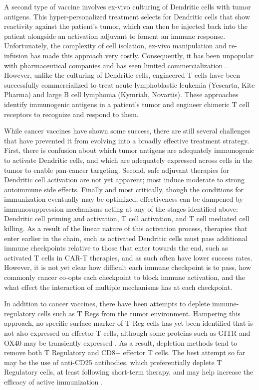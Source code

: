 A second type of vaccine involves ex-vivo culturing of Dendritic cells with tumor antigens. 
This hyper-personalized treatment selects for Dendritic cells that show reactivity against the patient’s tumor, which can then be injected back into the patient alongside an activation adjuvant to foment an immune response. 
Unfortunately, the complexity of cell isolation, ex-vivo manipulation and re-infusion has made this approach very costly. 
Consequently, it has been unpopular with pharmaceutical companies and has seen limited commercialization \citep{Mellman2011}.
However, unlike the culturing of Dendritic cells, engineered T cells have been successfully commercialized to treat acute lymphoblastic leukemia (Yescarta, Kite Pharma) and large B cell lymphoma (Kymriah, Novartis).
These approaches identify immunogenic antigens in a patient’s tumor and engineer chimeric T cell receptors to recognize and respond to them.  

While cancer vaccines have shown some success, there are still several challenges that have prevented it from evolving into a broadly effective treatment strategy. 
First, there is confusion about which tumor antigens are adequately immunogenic to activate Dendritic cells, and which are adequately expressed across cells in the tumor to enable pan-cancer targeting.
Second, safe adjuvant therapies for Dendritic cell activation are not yet apparent; most induce moderate to strong autoimmune side effects. 
Finally and most critically, though the conditions for immunization eventually may be optimized, effectiveness can be dampened by immunosuppression mechanisms acting at any of the stages identified above: Dendritic cell priming and activation, T cell activation, and T cell mediated cell killing.
As a result of the linear nature of this activation process, therapies that enter earlier in the chain, such as activated Dendritic cells must pass additional immune checkpoints relative to those that enter towards the end, such as activated T cells in CAR-T therapies, and as such often have lower success rates. 
However, it is not yet clear how difficult each immune checkpoint is to pass, how commonly cancer co-opts each checkpoint to block immune activation, and the what effect the interaction of multiple mechanisms has at each checkpoint.

In addition to cancer vaccines, there have been attempts to deplete immune-regulatory cells such as T Regs from the tumor environment. 
Hampering this approach, no specific surface marker of T Reg cells has yet been identified that is not also expressed on effector T cells, although some proteins such as GITR and OX40 may be transiently expressed \citep{Ito2006,Cohen2010}.
As a result, depletion methods tend to remove both T Regulatory and CD8+ effector T cells. 
The best attempt so far may be the use of anti-CD25 antibodies, which preferentially deplete T Regulatory cells, at least following short-term therapy, and may help increase the efficacy of active immunization \citep{Golovina2010}. 

